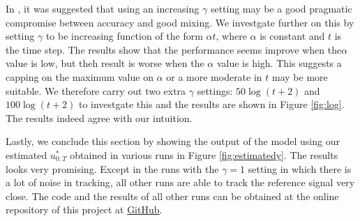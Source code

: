 In \cite{NK11}, it was suggested that using an increasing $\gamma$ setting may be a good pragmatic compromise between accuracy and good mixing. We investgate further on this by setting $\gamma$ to be increasing function of the form $\alpha t$, where $\alpha$ is constant and $t$ is the time step. The results show that the performance seems improve when the$\alpha$ value is low, but theh result is worse when the $\alpha$ value is high. This suggests a capping on the maximum value on $\alpha$ or a more moderate in $t$ may be more suitable. We therefore carry out two extra $\gamma$ settings: $50\log(t+2)$ and $100\log(t+2)$ to investgate this and the results are shown in Figure \ref{fig:log}. The results indeed agree with our intuition.

Lastly, we conclude this section by showing the output of the model using our estimated $u^*_{0:T}$ obtained in various runs in Figure \ref{fig:estimatedy}. The results looks very promising. Except in the runs with the $\gamma=1$ setting in which there is a lot of noise in tracking, all other runs are able to track the reference signal very close. The code and the results of all other runs can be obtained at the online repository of this project at \href{https://github.com/yowtzu/mscproj}{GitHub}.

